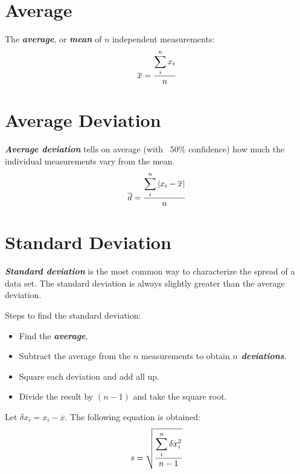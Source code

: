 \documentclass[12pt, a4paper]{article}
\newcommand{\avg}{\overline}
\newcommand{\SUM}[1]{\mathlarger{\sum\limits #1}}
\newcommand{\impt}[1]{\textbf{\textit{#1}}}
\newcommand{\hi}{\section}
\begin{document}
\hi{Average}
    \par The \impt{average}, or \impt{mean} of $n$ independent measurements:
    \begin{equation}
        \avg{x} = \dfrac{\SUM{_{i}^{n} x_{i}}}{n}
    \end{equation}

\hi{Average Deviation}
    \par \impt{Average deviation} tells on average (with ~50\% confidence) how
    much the individual measurements vary from the mean.
    \begin{equation}
        \avg{d} = \dfrac{\SUM{_{i}^{n} |x_{i} - \avg{x}|}}{n}
    \end{equation}

\hi{Standard Deviation}
    \par \impt{Standard deviation} is the most common way to characterize
    the spread of a data set. The standard deviation is always slightly greater
    than the average deviation.
    \par Steps to find the standard deviation:
    \begin{itemize}
        \item Find the \impt{average}.
        \item Subtract the average from the $n$ measurements to obtain
            \impt{$n$ deviations}.
        \item Square each deviation and add all up.
        \item Divide the result by $(n - 1)$ and take the square root.
    \end{itemize}
    \par Let $\delta x_{i} = x_{i} - \avg{x}$. The following equation is
    obtained:
    \begin{equation}
        s = \sqrt{\dfrac{\SUM{_{i}^{n} \delta x_{i}^{2}}}{n - 1}}
    \end{equation}
\end{document}
